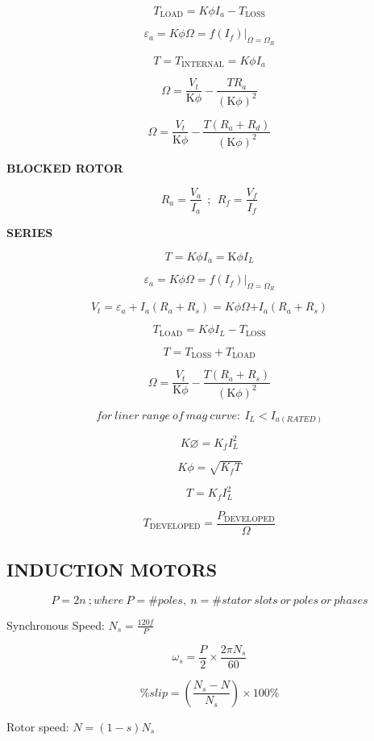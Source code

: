\begin{multicols}{2}
	\[T_{\text{LOAD}} = K\phi I_{a} - T_{\text{LOSS}}\]
	
	\[\varepsilon_{a} = K\phi\Omega = f\left( I_{f} \right)|_{\Omega = \Omega_{R}}\]
	
	\[T = T_{\text{INTERNAL}} = K\phi I_{a}\]
	
	\[\Omega = \frac{V_{t}}{\text{K}\phi} - \frac{TR_{a}}{\left( \text{K}\phi \right)^{2}}\]
	
	\[\Omega = \frac{V_{t}}{\text{K}\phi} - \frac{T(R_{a} + R_{d})}{\left( \text{K}\phi \right)^{2}}\]
	
	\textbf{BLOCKED ROTOR}
	
	\[R_{a} = \frac{V_{a}}{I_{a}}\ \ ;\ \ R_{f} = \frac{V_{f}}{I_{f}}\]
	
	\textbf{SERIES}
	
	\[T = K\phi I_{a} = \text{K}\phi I_{L}\]
	
	\[\varepsilon_{a} = K\phi\Omega = f(I_{f})|_{\Omega = \Omega_{R}}\]
	
	\[V_{t} = \varepsilon_{a} + I_{a}(R_{a} + R_{s}) = K\phi\Omega{+ I}_{a}(R_{a} + R_{s})\]
	
	\[T_{\text{LOAD}} = K\phi I_{L} - T_{\text{LOSS}}\]
	
	\[T = T_{\text{LOSS}} + T_{\text{LOAD}}\]
	
	\[\Omega = \frac{V_{t}}{\text{K}\phi} - \frac{T(R_{a} + R_{s})}{\left( \text{K}\phi \right)^{2}}\]
	
	\[for\ liner\ range\ of\ mag\ curve:\ I_{L} < I_{a(RATED)}\]
	
	\[K\varnothing = K_{f}I_{L}^{2}\]
	
	\[K\phi = \sqrt{K_{f}T}\]
	
	\[T = K_{f}I_{L}^{2}\]
	
	\[T_{\text{DEVELOPED}} = \frac{P_{\text{DEVELOPED}}}{\Omega}\]
	
	\subsection{INDUCTION MOTORS}
	
	\[P = 2n\ ;where\ P = \# poles,\ n = \# stator\ slots\ or\ poles\ or\ phases\]
	
	Synchronous Speed: \(N_{s} = \frac{120f}{P}\)
	
	\[\omega_{s} = \frac{P}{2} \times \frac{2\pi N_{s}}{60}\]
	
	\[\% slip = \left( \frac{N_{s} - N}{N_{s}} \right) \times 100\%\]
	
	Rotor speed: \(N = (1 - s)N_{s}\)
	

\end{multicols}
